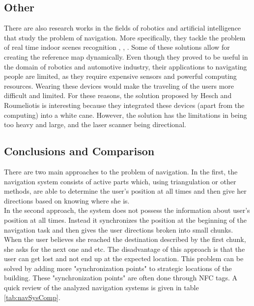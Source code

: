 \subsection{Other}
There are also research works in the fields of robotics and artificial intelligence that study the problem of navigation. More specifically, they tackle the problem of real time indoor scenes recognition \cite{espinace}, \cite{quattoni}, \cite{bosch}. Some of these solutions allow for creating the reference map dynamically. Even though they proved to be useful in the domain of robotics and automotive industry, their applications to navigating people are limited, as they require expensive sensors and powerful computing resources. Wearing these devices would make the traveling of the users more difficult and limited. For these reasons, the solution proposed by Hesch and Roumeliotis \cite{hesch} is interesting because they integrated these devices (apart from the computing) into a white cane. However, the solution has the limitations in being too heavy and large, and the laser scanner being directional.

\subsection{Conclusions and Comparison}
There are two main approaches to the problem of navigation. In the first, the navigation system consists of active parts which, using triangulation or other methods, are able to determine the user's position at all times and then give her directions based on knowing where she is.\\In the second approach, the system does not possess the information about user's position at all times. Instead it synchronizes the position at the beginning of the navigation task and then gives the user directions broken into small chunks. When the user believes she reached the destination described by the first chunk, she asks for the next one and etc. The disadvantage of this approach is that the user can get lost and not end up at the expected location. This problem can be solved by adding more "synchronization points" to strategic locations of the building. These "synchronization points" are often done through NFC tags. A quick review of the analyzed navigation systems is given in table \ref{tab:navSysComp}.



